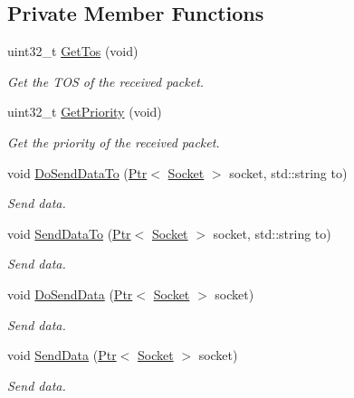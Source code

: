 \subsection*{Private Member Functions}
\begin{DoxyCompactItemize}
\item 
uint32\+\_\+t \hyperlink{classUdpSocketImplTest_a7afa9bafbaec77d3adca11b4c04df064}{Get\+Tos} (void)
\begin{DoxyCompactList}\small\item\em Get the T\+OS of the received packet. \end{DoxyCompactList}\item 
uint32\+\_\+t \hyperlink{classUdpSocketImplTest_a62f83f508eb6ec572ecda6ab2e43b231}{Get\+Priority} (void)
\begin{DoxyCompactList}\small\item\em Get the priority of the received packet. \end{DoxyCompactList}\item 
void \hyperlink{classUdpSocketImplTest_adc612255d5ec479a76941f697bde796a}{Do\+Send\+Data\+To} (\hyperlink{classns3_1_1Ptr}{Ptr}$<$ \hyperlink{classns3_1_1Socket}{Socket} $>$ socket, std\+::string to)
\begin{DoxyCompactList}\small\item\em Send data. \end{DoxyCompactList}\item 
void \hyperlink{classUdpSocketImplTest_a6d164a214837efedad2b6aa32a9fad0e}{Send\+Data\+To} (\hyperlink{classns3_1_1Ptr}{Ptr}$<$ \hyperlink{classns3_1_1Socket}{Socket} $>$ socket, std\+::string to)
\begin{DoxyCompactList}\small\item\em Send data. \end{DoxyCompactList}\item 
void \hyperlink{classUdpSocketImplTest_abb4bfa5a84b8b642f22fd0f8981bf515}{Do\+Send\+Data} (\hyperlink{classns3_1_1Ptr}{Ptr}$<$ \hyperlink{classns3_1_1Socket}{Socket} $>$ socket)
\begin{DoxyCompactList}\small\item\em Send data. \end{DoxyCompactList}\item 
void \hyperlink{classUdpSocketImplTest_a69244de27acf4b1f164091057321b414}{Send\+Data} (\hyperlink{classns3_1_1Ptr}{Ptr}$<$ \hyperlink{classns3_1_1Socket}{Socket} $>$ socket)
\begin{DoxyCompactList}\small\item\em Send data. \end{DoxyCompactList}\end{DoxyCompactItemize}
